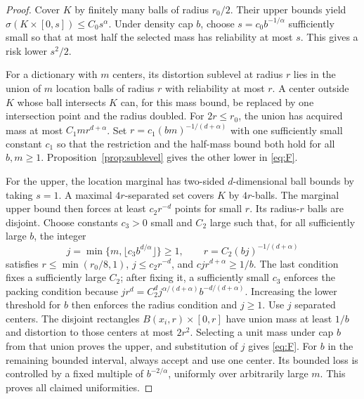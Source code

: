 \begin{proof}
Cover $K$ by finitely many balls of radius $r_0/2$. Their upper bounds yield $\sigma(K\times[0,s])\le C_0s^\alpha$. Under density cap $b$, choose $s=c_0b^{-1/\alpha}$ sufficiently small so that at most half the selected mass has reliability at most $s$. This gives a risk lower $s^2/2$.

For a dictionary with $m$ centers, its distortion sublevel at radius $r$ lies in the union of $m$ location balls of radius $r$ with reliability at most $r$. A center outside $K$ whose ball intersects $K$ can, for this mass bound, be replaced by one intersection point and the radius doubled. For $2r\le r_0$, the union has acquired mass at most $C_1m r^{d+\alpha}$. Set $r=c_1(bm)^{-1/(d+\alpha)}$ with one sufficiently small constant $c_1$ so that the restriction and the half-mass bound both hold for all $b,m\ge1$. Proposition~\ref{prop:sublevel} gives the other lower in \eqref{eq:F}.

For the upper, the location marginal has two-sided $d$-dimensional ball bounds by taking $s=1$. A maximal $4r$-separated set covers $K$ by $4r$-balls. The marginal upper bound then forces at least $c_2r^{-d}$ points for small $r$. Its radius-$r$ balls are disjoint. Choose constants $c_3>0$ small and $C_2$ large such that, for all sufficiently large $b$, the integer
\[
 j=\min\{m,\lfloor c_3b^{d/\alpha}\rfloor\}\ge1,
 \qquad r=C_2(bj)^{-1/(d+\alpha)}
\]
satisfies $r\le\min(r_0/8,1)$, $j\le c_2r^{-d}$, and $cj r^{d+\alpha}\ge1/b$. The last condition fixes a sufficiently large $C_2$; after fixing it, a sufficiently small $c_3$ enforces the packing condition because
$j r^d=C_2^d j^{\alpha/(d+\alpha)}b^{-d/(d+\alpha)}$.
Increasing the lower threshold for $b$ then enforces the radius condition and $j\ge1$. Use $j$ separated centers. The disjoint rectangles $B(x_i,r)\times[0,r]$ have union mass at least $1/b$ and distortion to those centers at most $2r^2$. Selecting a unit mass under cap $b$ from that union proves the upper, and substitution of $j$ gives \eqref{eq:F}. For $b$ in the remaining bounded interval, always accept and use one center. Its bounded loss is controlled by a fixed multiple of $b^{-2/\alpha}$, uniformly over arbitrarily large $m$. This proves all claimed uniformities.
\end{proof}

